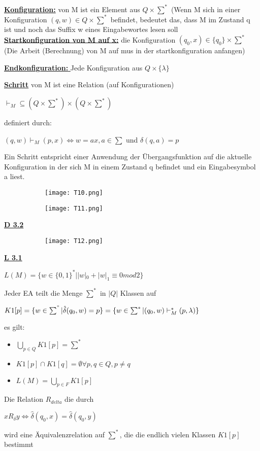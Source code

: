 \documentclass[8pt]{extreport}
\begin{document}
\underline{\textbf{Konfiguration:}} von M ist ein Element aus $Q \times \sum^*$  (Wenn M sich in einer Konfiguration $(q,w) \in Q \times \sum^*$ befindet, bedeutet das, dass M im Zustand q ist und noch das Suffix w eines Eingabewortes lesen soll\\
\underline{\textbf{ Startkonfiguration von M auf x:}} die Konfiguration $(q_0,x) \in \{q_0\} \times \sum^*$ (Die Arbeit (Berechnung) von M auf  mus in der startkonfiguration anfangen)

\underline{\textbf{Endkonfiguration: }} Jede Konfiguration aus $Q \times \{\lambda\}$

\underline{\textbf{ Schritt}} von M ist eine Relation (auf Konfigurationen)
\begin{center}
$\vdash_M \subseteq (Q \times \sum^*) \times (Q\times \sum^*)$
\end{center}
definiert durch:
\begin{center}
$(q,w) \vdash_M (p,x) \iff w=ax, a \in \sum$ und $\delta(q,a) = p$
\end{center}
Ein Schritt entspricht einer Anwendung der Übergangsfunktion auf die aktuelle Konfiguration in der sich M in einem Zustand q befindet und ein Eingabesymbol a liest.
\begin{figure}[H]
\centering
\begin{subfigure}[b]{0.49\linewidth}
\texttt{[image: T10.png]}
\end{subfigure}
\begin{subfigure}[b]{0.49\linewidth}
\texttt{[image: T11.png]}
\end{subfigure}
\end{figure}
\underline{\textbf{D 3.2}} 
\begin{figure}[H]
\centering
\begin{subfigure}[b]{0.49\linewidth}
\texttt{[image: T12.png]}
\end{subfigure}
\end{figure}

\underline{\textbf{L 3.1}} 
\begin{center}
$L(M) = \{w \in \{0,1\}^* | |w|_0 + |w|_1 \equiv 0 mod 2 \}$
\end{center}

Jeder EA teilt die Menge $\sum^*$ in $|Q|$ Klassen auf
\begin{center}
$K1[p] = \{w \in \sum^" | \hat{\delta}(q_0,w) = p \} = \{ w \in \sum^* | (q_0,w) \vdash_M^*(p,\lambda)\}$
\end{center}
es gilt:
\begin{itemize}
\item $\bigcup_{p\in Q}K1[p] = \sum^*$ 
\item $K1[p] \cap K1[q] = \emptyset \forall p,q \in Q, p\neq q$
\item $L(M) = \bigcup_{p\in F} K1[p]$
\end{itemize}
Die Relation $R_{delta}$ die durch
\begin{center}
$x R_{\delta} y \iff \hat{\delta}(q_0,x) = \hat{\delta}(q_0,y)$
\end{center}
wird eine Äquivalenzrelation auf $\sum^*$, die die endlich vielen Klassen $K1[p]$ bestimmt
\end{document}
